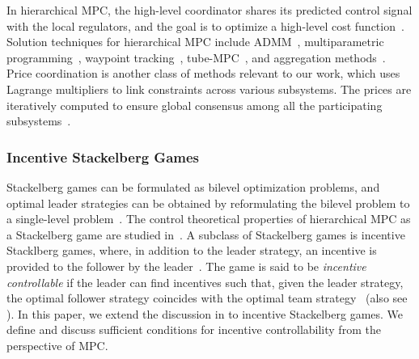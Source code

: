 In hierarchical MPC, the high-level coordinator shares its predicted control signal with the local regulators, and the goal is to optimize a high-level cost function~\cite{scattolini2007hierarchical,findeisen1980control}.
Solution techniques for hierarchical MPC include ADMM~\cite{braun2018hierarchical,zhang2020improved}, multiparametric programming~\cite{gupta2023hierarchical}, waypoint tracking~\cite{koeln2018two,koeln2020vertical}, tube-MPC~\cite{kogel2023safe,raghuraman2022hierarchical,picasso2010mpc}, and aggregation methods~\cite{johansson2012distributed}.
Price coordination is another class of methods relevant to our work, which uses Lagrange multipliers to link constraints across various subsystems.
The prices are iteratively computed to ensure global consensus among all the participating subsystems~\cite{mesarovic2000theory, findeisen1980control, negenborn2007efficient, amigoni2007formal, tatara2007control, negenborn2007multi}.


\subsubsection{Incentive Stackelberg Games}
\label{subsubsec:incentive-Stackelberg-games}

Stackelberg games can be formulated as bilevel optimization problems, and optimal leader strategies can be obtained by reformulating the bilevel problem to a single-level problem~\cite{zugno2013bilevel,jamaludin2015bilevel,ouattara2018duality}.
The control theoretical properties of hierarchical MPC as a Stackelberg game are studied in~\cite{mintz2018control}.
A subclass of Stackelberg games is incentive Stacklberg games, where, in addition to the leader strategy, an incentive is provided to the follower by the leader~\cite{mukaidani2020incentive,ho1982control,li2002approach}.
The game is said to be \emph{incentive controllable} if the leader can find incentives such that, given the leader strategy, the optimal follower strategy coincides with the optimal team strategy~\cite{ho1982control} (also see \cite[Sec.~2]{mukaidani2020incentive}).
In this paper, we extend the discussion in \cite{mintz2018control} to incentive Stackelberg games.
We define and discuss sufficient conditions for incentive controllability from the perspective of MPC.

